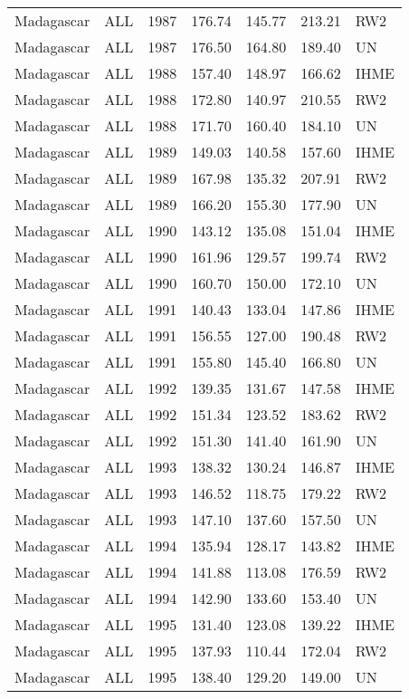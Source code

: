 \begin{longtable}{lllrrrl}
  Madagascar & ALL & 1987 & 176.74 & 145.77 & 213.21 & RW2 \\ 
  Madagascar & ALL & 1987 & 176.50 & 164.80 & 189.40 & UN \\ 
  Madagascar & ALL & 1988 & 157.40 & 148.97 & 166.62 & IHME \\ 
  Madagascar & ALL & 1988 & 172.80 & 140.97 & 210.55 & RW2 \\ 
  Madagascar & ALL & 1988 & 171.70 & 160.40 & 184.10 & UN \\ 
  Madagascar & ALL & 1989 & 149.03 & 140.58 & 157.60 & IHME \\ 
  Madagascar & ALL & 1989 & 167.98 & 135.32 & 207.91 & RW2 \\ 
  Madagascar & ALL & 1989 & 166.20 & 155.30 & 177.90 & UN \\ 
  Madagascar & ALL & 1990 & 143.12 & 135.08 & 151.04 & IHME \\ 
  Madagascar & ALL & 1990 & 161.96 & 129.57 & 199.74 & RW2 \\ 
  Madagascar & ALL & 1990 & 160.70 & 150.00 & 172.10 & UN \\ 
  Madagascar & ALL & 1991 & 140.43 & 133.04 & 147.86 & IHME \\ 
  Madagascar & ALL & 1991 & 156.55 & 127.00 & 190.48 & RW2 \\ 
  Madagascar & ALL & 1991 & 155.80 & 145.40 & 166.80 & UN \\ 
  Madagascar & ALL & 1992 & 139.35 & 131.67 & 147.58 & IHME \\ 
  Madagascar & ALL & 1992 & 151.34 & 123.52 & 183.62 & RW2 \\ 
  Madagascar & ALL & 1992 & 151.30 & 141.40 & 161.90 & UN \\ 
  Madagascar & ALL & 1993 & 138.32 & 130.24 & 146.87 & IHME \\ 
  Madagascar & ALL & 1993 & 146.52 & 118.75 & 179.22 & RW2 \\ 
  Madagascar & ALL & 1993 & 147.10 & 137.60 & 157.50 & UN \\ 
  Madagascar & ALL & 1994 & 135.94 & 128.17 & 143.82 & IHME \\ 
  Madagascar & ALL & 1994 & 141.88 & 113.08 & 176.59 & RW2 \\ 
  Madagascar & ALL & 1994 & 142.90 & 133.60 & 153.40 & UN \\ 
  Madagascar & ALL & 1995 & 131.40 & 123.08 & 139.22 & IHME \\ 
  Madagascar & ALL & 1995 & 137.93 & 110.44 & 172.04 & RW2 \\ 
  Madagascar & ALL & 1995 & 138.40 & 129.20 & 149.00 & UN \\ 

\end{longtable}
